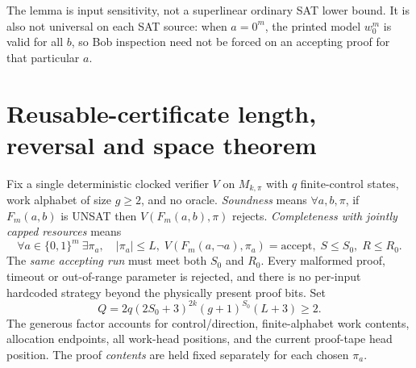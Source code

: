 \documentclass[11pt]{article}
\begin{document}
The lemma is input sensitivity, not a superlinear ordinary SAT lower bound. It is also not universal on each SAT source: when $a=0^m$, the printed model $w_0^m$ is valid for all $b$, so Bob inspection need not be forced on an accepting proof for that particular $a$.

\section{Reusable-certificate length, reversal and space theorem}
Fix a single deterministic clocked verifier $V$ on $M_{k,\pi}$ with $q$ finite-control states, work alphabet of size $g\ge2$, and no oracle. \emph{Soundness} means $\forall a,b,\pi$, if $F_m(a,b)$ is UNSAT then $V(F_m(a,b),\pi)$ rejects. \emph{Completeness with jointly capped resources} means
\[
\forall a\in\{0,1\}^m\ \exists\pi_a,\quad
|\pi_a|\le L,\; V(F_m(a,\neg a),\pi_a)=\text{accept},\;
S\le S_0,\;R\le R_0.\tag{2}
\]
The \emph{same accepting run} must meet both $S_0$ and $R_0$. Every malformed proof, timeout or out-of-range parameter is rejected, and there is no per-input hardcoded strategy beyond the physically present proof bits. Set
\[
Q=2q(2S_0+3)^{2k}(g+1)^{S_0}(L+3)\ge2.\tag{3}
\]
The generous factor accounts for control/direction, finite-alphabet work contents, allocation endpoints, all work-head positions, and the current proof-tape head position. The proof \emph{contents} are held fixed separately for each chosen $\pi_a$.
\end{document}
